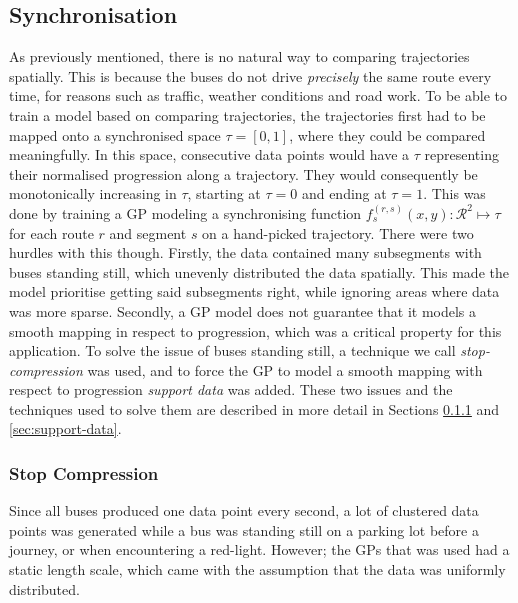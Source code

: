 \subsection{Synchronisation}
As previously mentioned, there is no natural way to comparing
trajectories spatially. This is because the buses do not drive
\textit{precisely} the same route every time, for reasons such as
traffic, weather conditions and road work. To be able to train a model
based on comparing trajectories, the trajectories first had to be
mapped onto a synchronised space $\tau = [0, 1]$, where they could be
compared meaningfully. In this space, consecutive data points would
have a $\tau$ representing their normalised progression along a
trajectory. They would consequently be monotonically increasing in
$\tau$, starting at $\tau=0$ and ending at $\tau=1$. This was done by
training a GP modeling a synchronising function $f^{(r,s)}_s(x, y) : \mathcal{R}^2 \mapsto
\tau$ for each route $r$ and segment $s$ on a hand-picked
trajectory. There were two hurdles with this though. Firstly, the data
contained many subsegments with buses standing still, which unevenly
distributed the data spatially. This made the model prioritise getting
said subsegments right, while ignoring areas where data was more
sparse. Secondly, a GP model does not guarantee that
it models a smooth mapping in respect to progression, which was a
critical property for this application. To solve the issue of buses
standing still, a technique we call \textit{stop-compression} was
used, and to force the GP to model a smooth mapping with respect to
progression \textit{support data} was added. These two issues and the techniques used to solve
them are described in more detail in
Sections \ref{sec:stop-compression} and \ref{sec:support-data}.

\subsubsection{Stop Compression}
\label{sec:stop-compression}
Since all buses produced one data point every second, a lot of
clustered data points was generated while a bus was standing still on
a parking lot before a journey, or when encountering a
red-light. However; the GPs that was used had a static length scale, which came with the assumption that the data was uniformly distributed.

